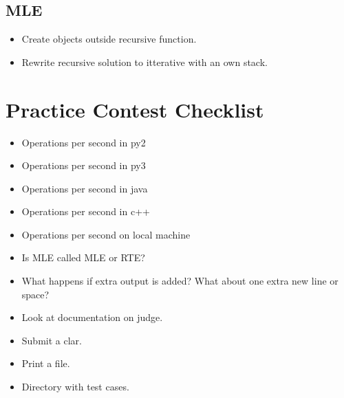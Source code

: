 \documentclass[8pt,a4paper,landscape,oneside]{amsart}
\begin{document}
\begin{multicols*}{2}
\begin{large}
    \subsection{MLE}
        \begin{itemize}
        \item Create objects outside recursive function.
        \item Rewrite recursive solution to itterative with an own stack.
        \end{itemize}
\newpage
\section{Practice Contest Checklist}
\begin{itemize}
    \item Operations per second in py2
    \item Operations per second in py3
    \item Operations per second in java
    \item Operations per second in c++
    \item Operations per second on local machine
    \item Is MLE called MLE or RTE?
    \item What happens if extra output is added? What about one extra new line or space?
    \item Look at documentation on judge.
    \item Submit a clar.
    \item Print a file.
    \item Directory with test cases.
\end{itemize}


\end{large}
\end{multicols*}
\end{document}
